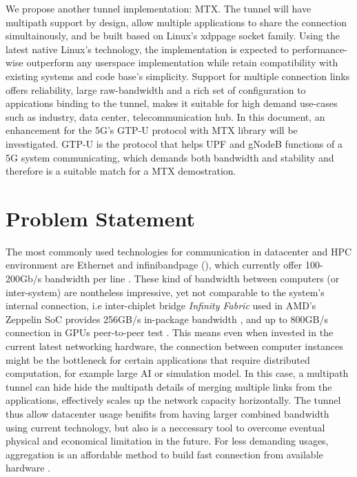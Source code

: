 We propose another tunnel implementation: \ac{MTX}. 
The tunnel will have multipath support by design, allow multiple applications to share the connection simultainously, and be built based on Linux's \ac{xdppage} socket family.
Using the latest native Linux's technology, the implementation is expected to performance-wise outperform any userspace implementation while retain compatibility with existing systems and code base's simplicity. 
Support for multiple connection links offers reliability, large raw-bandwidth and a rich set of configuration to appications binding to the tunnel, makes it suitable for high demand use-cases such as industry, data center, telecommunication hub. 
In this document, an enhancement for the 5G's GTP-U protocol with \ac{MTX} library will be investigated. GTP-U is the protocol that helps UPF and gNodeB functions of a 5G system communicating, which demands both bandwidth and stability and therefore is a suitable match for a \ac{MTX} demostration.


\section{Problem Statement}
The most commonly used technologies for communication in datacenter and \ac{HPC} environment are Ethernet and \ac{infinibandpage} (), which currently offer 100-200Gb/s bandwidth per line \cite{ethernet_roadmap}\cite{infiniband_roadmap}.
These kind of bandwidth between computers (or inter-system) are nontheless impressive, yet not comparable to the system's internal connection, i.e inter-chiplet bridge \textit{Infinity Fabric} used in AMD's Zeppelin SoC provides 256GB/s in-package bandwidth \cite{burd_zeppelin_2019}, and up to 800GB/s connection in GPUs peer-to-peer test \cite{amd_infinity_architecture}.
This means even when invested in the current latest networking hardware, the connection between computer instances might be the bottleneck for certain applications that require distributed computation, for example large \ac{AI} or simulation model.
In this case, a multipath tunnel can hide hide the multipath details of merging multiple links from the applications, effectively scales up the network capacity horizontally.
The tunnel thus allow datacenter usage benifits from having larger combined bandwidth using current technology, but also is a neccessary tool to overcome eventual physical and economical limitation in the future.
For less demanding usages, aggregation is an affordable method to build fast connection from available hardware .

